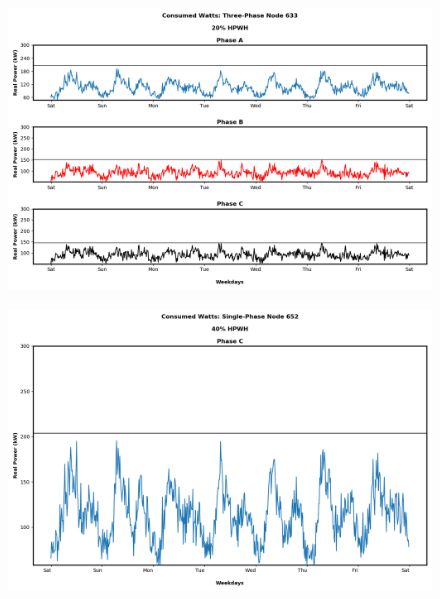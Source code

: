 \begin{figure}[H]
    \centering
    \includegraphics[width=1.1\columnwidth]{Pictures/twenty_three_phase_633_power.png}
    \caption{ }
\end{figure}




\begin{figure}[H]
    \centering
    \includegraphics[width=1.1\columnwidth]{Pictures/fourty_single_phase_652_power.png}
    \caption{ }
\end{figure}

\newpage

